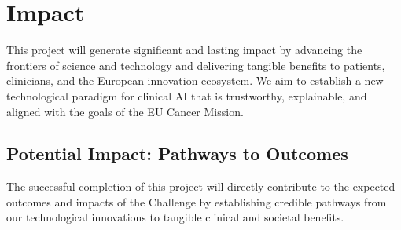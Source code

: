\documentclass[11pt, a4paper]{article}
\begin{document}
\section{Impact}
This project will generate significant and lasting impact by advancing the frontiers of science and technology and delivering tangible benefits to patients, clinicians, and the European innovation ecosystem. We aim to establish a new technological paradigm for clinical AI that is trustworthy, explainable, and aligned with the goals of the EU Cancer Mission.

\subsection{Potential Impact: Pathways to Outcomes}
The successful completion of this project will directly contribute to the expected outcomes and impacts of the Challenge by establishing credible pathways from our technological innovations to tangible clinical and societal benefits.
\end{document}
